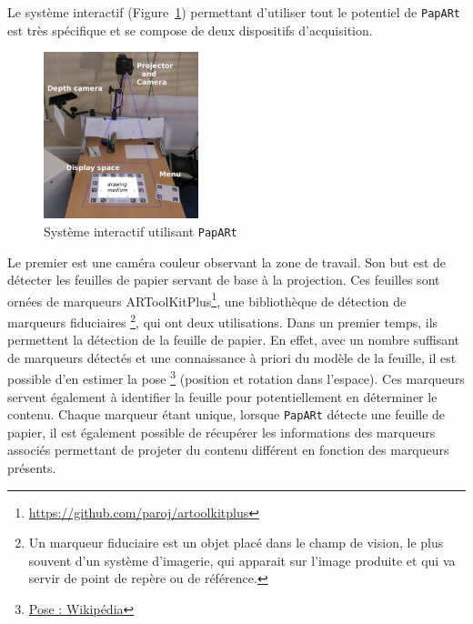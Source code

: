 Le système interactif (Figure~\ref{fig:papartsystem}) permettant d'utiliser tout le potentiel de \texttt{PapARt} est très spécifique et se compose de deux dispositifs d'acquisition.

\begin{figure}[H]
\centering
\includegraphics[width=0.4\textwidth]{images/papart-system}
\caption{Système interactif utilisant \texttt{PapARt}\protect\footnotemark}
\label{fig:papartsystem}
\end{figure}


Le premier est une caméra couleur observant la zone de travail. Son but est de détecter les feuilles de papier servant de base à la projection. Ces feuilles sont ornées de marqueurs ARToolKitPlus\footnote{\href{https://github.com/paroj/artoolkitplus}{https://github.com/paroj/artoolkitplus}}, une bibliothèque de détection de marqueurs fiduciaires \footnote{Un marqueur fiduciaire est un objet placé dans le champ de vision, le plus souvent d'un système d'imagerie, qui apparait sur l'image produite et qui va servir de point de repère ou de référence.}, qui ont deux utilisations. 
Dans un premier temps, ils permettent la détection de la feuille de papier. En effet, avec un nombre suffisant de marqueurs détectés et une connaissance à priori du modèle de la feuille, il est possible d'en estimer la pose \footnote{\href{https://en.wikipedia.org/wiki/Pose_(computer_vision)}{Pose : Wikipédia}} (position et rotation dans l'espace). 
Ces marqueurs servent également à identifier la feuille pour potentiellement en déterminer le contenu. Chaque marqueur étant unique, lorsque \texttt{PapARt} détecte une feuille de papier, il est également possible de récupérer les informations des marqueurs associés permettant de projeter du contenu différent en fonction des marqueurs présents.

